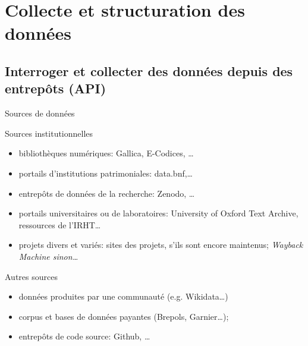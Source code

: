 \documentclass[ignorenonframetext]{beamer}
\begin{document}
\section{Collecte et structuration des données}


\subsection{Interroger et collecter des données depuis des entrepôts (API)}


\begin{frame}{Sources de données}

		\begin{block}{Sources institutionnelles}
			\begin{itemize}
				\item bibliothèques numériques: Gallica, E-Codices, …
				\item portails d'institutions patrimoniales: data.bnf,…
				\item entrepôts de données de la recherche: Zenodo, …
				\item portails universitaires ou de laboratoires: University of Oxford Text Archive, ressources de l'IRHT… 
				\item projets divers et variés: sites des projets, s'ils sont encore maintenus; \textit{Wayback Machine sinon…}
			\end{itemize}
		\end{block}
	
	\begin{block}{Autres sources}
		\begin{itemize}
			\item données produites par une communauté (e.g. Wikidata…)
			\item corpus et bases de données payantes (Brepols, Garnier…);
			\item entrepôts de code source: Github, …
		\end{itemize}
	\end{block}

\end{frame}
\end{document}
